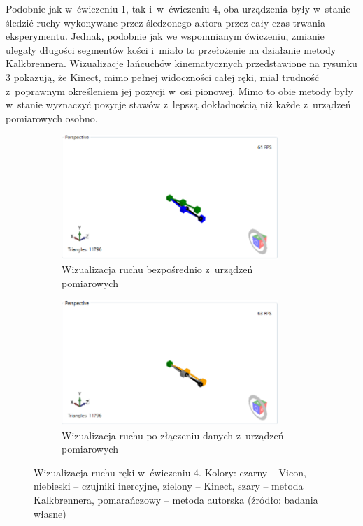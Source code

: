 Podobnie jak w~ćwiczeniu 1, tak i~w~ćwiczeniu 4, oba urządzenia były w~stanie śledzić ruchy wykonywane przez śledzonego aktora przez cały czas trwania eksperymentu. Jednak, podobnie jak we wspomnianym ćwiczeniu, zmianie ulegały długości segmentów kości i~miało to przełożenie na działanie metody Kalkbrennera. Wizualizacje łańcuchów kinematycznych przedstawione na rysunku \ref{fig:experiments:four} pokazują, że Kinect, mimo pełnej widoczności całej ręki, miał trudność z~poprawnym określeniem jej pozycji w~osi pionowej. Mimo to obie metody były w~stanie wyznaczyć pozycje stawów z~lepszą dokładnością niż każde z~urządzeń pomiarowych osobno.

\begin{figure}[!htb]
	\captionsetup{singlelinecheck=off}
	\centering
	\begin{subfigure}[b]{0.48\textwidth}
		\centering
		\includegraphics[width=0.9\textwidth]{images/400/raw.png}	
		\caption{Wizualizacja ruchu bezpośrednio z~urządzeń pomiarowych}
		\label{fig:experiments:four:raw}
	\end{subfigure}
	\hfill																																											
	\begin{subfigure}[b]{0.48\textwidth}
		\centering
		\includegraphics[width=0.9\textwidth]{images/400/Fused.png}		
		\caption{Wizualizacja ruchu po złączeniu danych z~urządzeń pomiarowych}
		\label{fig:experiments:four:fused}	
	\end{subfigure}
																																													
	\caption[Wizualizacja ruchu ręki w~ćwiczeniu 4]{Wizualizacja ruchu ręki w~ćwiczeniu 4.  Kolory: czarny -- Vicon, niebieski -- czujniki inercyjne, zielony -- Kinect, szary -- metoda Kalkbrennera, pomarańczowy -- metoda autorska (źródło: badania własne)}	
	\label{fig:experiments:four}
\end{figure}
																						
